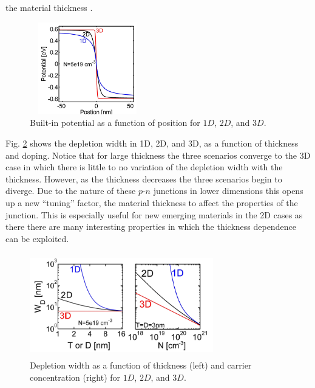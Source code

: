 \documentclass[%
 reprint,
 amsmath,amssymb,
 aps,
pra,
floatfix,
]{revtex4-1}
\begin{document}
the material thickness \cite{Ilatikhameneh2017}. 
%
\begin{figure}[h!]
    \centering
    \includegraphics[height=4cm,width=5cm]{figs/2d_3d}
    \caption{Built-in potential as a function of position for $1D$, $2D$, and $3D$.}
    \label{fig:fig8}
\end{figure}
%
Fig. \ref{fig:fig9} shows the depletion width in 1D, 2D, and 3D,  as a function of thickness and doping. Notice that for large thickness
the three scenarios converge to the 3D case in which there is little to no variation of the depletion width with the thickness.
However, as the thickness decreases the three scenarios begin to diverge. Due to the nature of these $p$-$n$ junctions in lower dimensions this opens up
a new ``tuning'' factor, the material thickness to affect the properties of the junction. This is especially useful for new emerging materials in the 2D cases as there
there are many interesting properties in which the thickness dependence can be exploited.
%
\begin{figure}[h!]
    \centering
    \includegraphics[height=4.5cm,width=8cm]{figs/2d_3d_wd_dep}
    \caption{Depletion width as a function of thickness (left) and carrier concentration (right) for $1D$, $2D$, and $3D$.}
    \label{fig:fig9}
\end{figure} 
\end{document}
